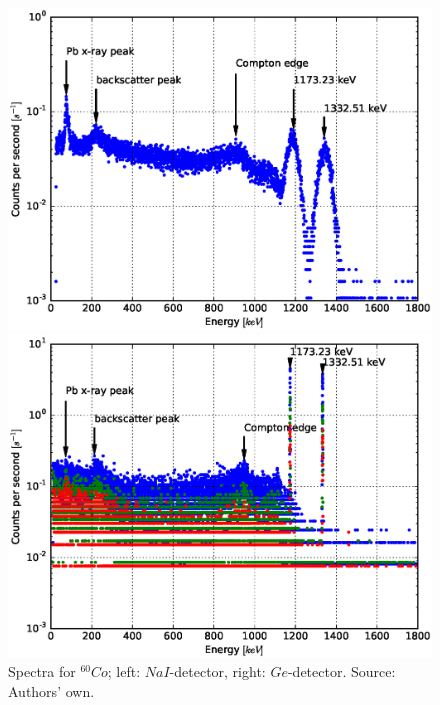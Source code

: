 \documentclass[a4paper]{article}
\begin{document}
\begin{figure}[H]
	\begin{minipage}[t]{0.5\textwidth}
		\begin{center}
		\includegraphics[width=1.0\textwidth]{plots/co60.eps}
		\end{center}
	\end{minipage}
	\begin{minipage}[t]{0.5\textwidth}
		\begin{center}
		\includegraphics[width=1.0\textwidth]{plots/co60_ged.eps}
		\end{center}
	\end{minipage}
	\caption{Spectra for $^{60}Co$; left: $NaI$-detector, right: $Ge$-detector. Source: Authors' own.}
	\label{fig:co60}
\end{figure}
\end{document}

